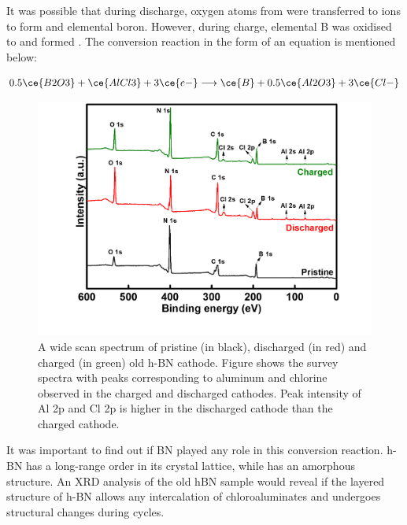 It was possible that during discharge, oxygen atoms from  were transferred to  ions to form  and elemental boron. However, during charge, elemental B was oxidised to  and  formed . The conversion reaction in the form of an equation is mentioned below: 

\begin{align}
  0.5\ce{B2O3} + \ce{AlCl3} + 3\ce{e-} \longrightarrow \ce{B} + 0.5\ce{Al2O3} + 3\ce{Cl-}
\end{align}

\begin{figure}[tbh!]
\centering
\includegraphics[width=\textwidth]{Figures/BOhBN/hBNXPS}
\caption{A wide scan spectrum of pristine (in black), discharged (in red) and charged (in green) old h-BN cathode. Figure shows the survey spectra with peaks corresponding to aluminum and chlorine observed in the charged and discharged cathodes. Peak intensity of Al 2p and Cl 2p is higher in the discharged cathode than the charged cathode.}
\label{Figures/BOhBN:hBNXPS}
\end{figure}

It was important to find out if BN played any role in this conversion reaction. h-BN has a long-range order in its crystal lattice, while  has an amorphous structure. An XRD analysis of the old hBN sample would reveal if the layered structure of h-BN allows any intercalation of chloroaluminates and undergoes structural changes during cycles.

